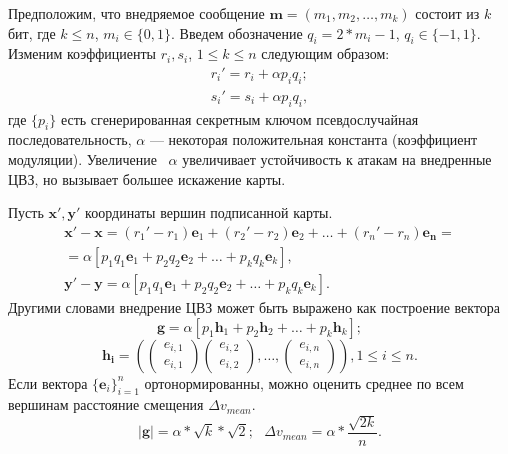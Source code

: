 Предположим, что внедряемое сообщение $\mathbf{m} = (m_1, m_2, \dots, m_k)$ состоит из $k$ бит, где $k \le n$, 
$m_i \in \{0, 1\}$. Введем обозначение $q_i = 2 * m_i - 1$, $q_i \in \{-1, 1\}$.
Изменим коэффициенты $r_i, s_i$, $1 \le k \le n$ следующим образом:
\begin{eqnarray*}
  r_i' = r_i + \alpha p_i q_i; \\
  s_i' = s_i + \alpha p_i q_i, 
\end{eqnarray*}
где $\{p_i\}$ есть сгенерированная секретным ключом псевдослучайная последовательность, $\alpha$ --- некоторая положительная константа (коэффициент модуляции). 
Увеличение ~$\alpha$ увеличивает устойчивость к атакам на внедренные ЦВЗ, но вызывает большее искажение
карты. 

Пусть $\mathbf{x'}, \mathbf{y'}$ координаты вершин подписанной карты. 
\begin{eqnarray*}
  \mathbf{x'} - \mathbf{x} = (r_1' - r_1) \mathbf{e}_1 + (r_2' - r_2) \mathbf{e}_2 + \dots + (r_n' - r_n) \mathbf{e_n} = \\
  = \alpha \left[ p_1 q_1 \mathbf{e}_1 + p_2 q_2 \mathbf{e}_2 + \dots + p_k q_k \mathbf{e}_k \right], \\
  \mathbf{y'} - \mathbf{y} = \alpha \left[ p_1 q_1 \mathbf{e}_1 + p_2 q_2 \mathbf{e}_2 + \dots + p_k q_k \mathbf{e}_k \right]. 
\end{eqnarray*}
Другими словами внедрение ЦВЗ может быть выражено как построение вектора  
\begin{equation}
\label{formula:g}
 \mathbf{g} = \alpha \left[ p_1 \mathbf{h}_1 + p_2 \mathbf{h}_2 + \dots + p_k \mathbf{h}_k \right]; 
\end{equation}
$$ \mathbf{h_i} = \left( \begin{pmatrix} e_{i, 1} \\ e_{i, 1} \end{pmatrix} 
\begin{pmatrix} e_{i, 2} \\ e_{i, 2} \end{pmatrix}, \dots, \begin{pmatrix} e_{i, n} \\e_{i, n}  \end{pmatrix} 
\right), 1 \le i \le n. $$
Если вектора $\{\mathbf{e}_i\}_{i=1}^n$ ортонормированны, можно оценить среднее по всем вершинам расстояние 
смещения $\Delta v_{mean}$.
\begin{equation}
\label{formula:mean_displacement}
|\mathbf{g}| = \alpha * \sqrt {k} * \sqrt{2}; \mbox{      } \Delta v_{mean} = \alpha * \frac{\sqrt{2k}}{n}. 
\end{equation}

